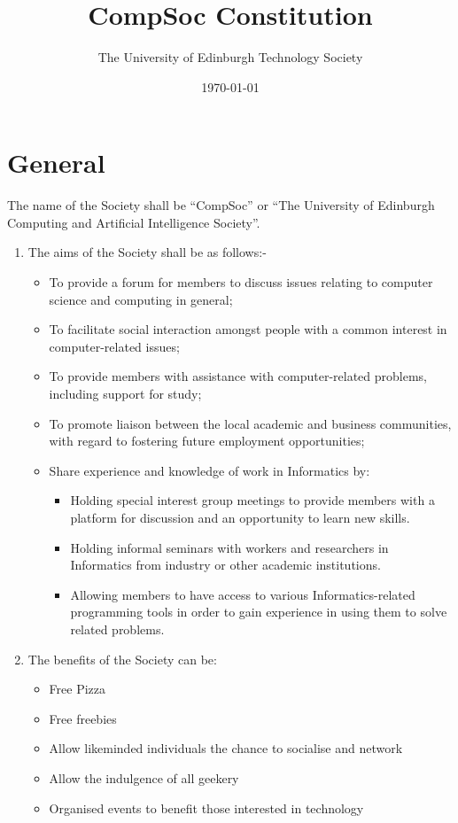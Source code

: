 \documentclass{article}
\begin{document}
\title{CompSoc Constitution}
\author{The University of Edinburgh Technology Society}
\date{\today{}}
\maketitle

\section{General}

The name of the Society shall be ``CompSoc'' or ``The University of
Edinburgh Computing and Artificial Intelligence Society''.

\begin{enumerate}
  \item The aims of the Society shall be as follows:-
    \begin{itemize}
      \item To provide a forum for members to discuss issues relating to computer science and computing in general;
      \item To facilitate social interaction amongst people with a common interest in computer-related issues;
      \item To provide members with assistance with computer-related problems, including support for study;
      \item To promote liaison between the local academic and business communities, with regard to fostering future employment opportunities;
      \item Share experience and knowledge of work in Informatics by:
        \begin{itemize}
          \item Holding special interest group meetings to provide members with a platform for discussion and an opportunity to learn new skills.
          \item Holding informal seminars with workers and researchers in Informatics from industry or other academic institutions.
          \item Allowing members to have access to various Informatics-related programming tools in order to gain experience in using them to solve related problems.
        \end{itemize}
    \end{itemize}


  \item The benefits of the Society can be:
    \begin{itemize}
      \item Free Pizza
      \item Free freebies
      \item Allow likeminded individuals the chance to socialise and network
      \item Allow the indulgence of all geekery
      \item Organised events to benefit those interested in technology
    \end{itemize}
    


\end{enumerate}
\end{document}
